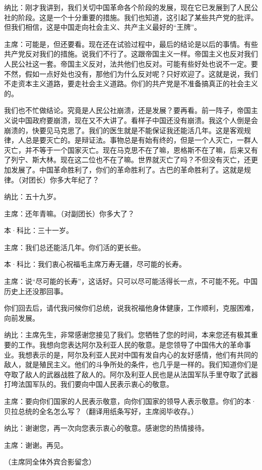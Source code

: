 纳比：刚才我讲到，我们关切中国革命各个阶段的发展，现在它已发展到了人民公社的阶段。这是一个十分重要的措施。我们也知道，这引起了某些共产党的批评。但我们相信，这是中国走向社会主义、共产主义最好的“王牌”。

主席：可能是，但还要看。现在还在试验过程中，最后的结论是以后的事情。有些共产党反对我们的措施。说我们不行了。这跟帝国主义一样。帝国主义也反对我们人民公社这一套。帝国主义反对，法共他们也反对。可能有些好处也说不一定。要不然，假如一点好处也没有，那他们为什么反对呢？只好欢迎了。这就是说，我们不走资本主义道路，要走社会主义道路。你们的共产党是不准备搞真正的社会主义的。

我们也不忙做结论。究竟是人民公社崩溃，还是发展？要再看。前一阵子，帝国主义说中国政府要崩溃，现在又不大讲了。看样子中国还没有崩溃。我这个人倒是会崩溃的，快要见马克思了。我们的医生就是不能保证我还能活几年。这是客观规律，人总是要灭亡的。是辩证法。事物总是有始有终的，但是一个人灭亡，一群人灭亡，并不等于一个国家灭亡。现在马克思不在了嘛，恩格斯不在了嘛，后来又有了列宁、斯大林。现在这二位也不在了嘛。世界就灭亡了吗？不但没有灭亡，还更加发展了。中国革命胜利了，你们的革命胜利了。古巴的革命胜利了。这就是规律。（对团长）你多大年纪了？

纳比：五十九岁。

主席：还年青嘛。（对副团长）你多大了？

本·科比：三十一岁。

主席：我们总还能活几年。你们活的更长些。

本·科比：我们衷心祝福毛主席万寿无疆，尽可能的长寿。

主席：说“尽可能的长寿”，这话好。只可以尽可能活得长一点，不可能不死。中国历史上还没那回事。

你们回去后，请代我问候你们总统，说我祝福他身体健康，工作顺利，克服困难，向前发展。

纳比：主席先生，非常感谢您接见了我们。您牺牲了您的时间，本来您还有极其重要的工作。我想向您表达阿尔及利亚人民的敬意。是您领导了中国伟大的革命事业。我想表示的是，阿尔及利亚人民对中国有发自内心的友好感情，他们有共同的敌人，就是殖民主义。他们的斗争所处的条件，也几乎是一样的。我们知道你们是夺取了敌人的武器战胜了敌人的。阿尔及利亚人民也是从法国军队手里夺取了武器打垮法国军队的。我们要向中国人民表示衷心的敬意。

主席：要向你们国家的人民表示敬意，向你们国家的领导人表示敬意。你们的本·贝拉总统的全名怎么写？（翻译用纸条写好，主席阅毕收存。）

纳比：谢谢您，再一次向您表示衷心的敬意。感谢您的热情接待。

主席：谢谢。再见。

（主席同全体外宾合影留念）

